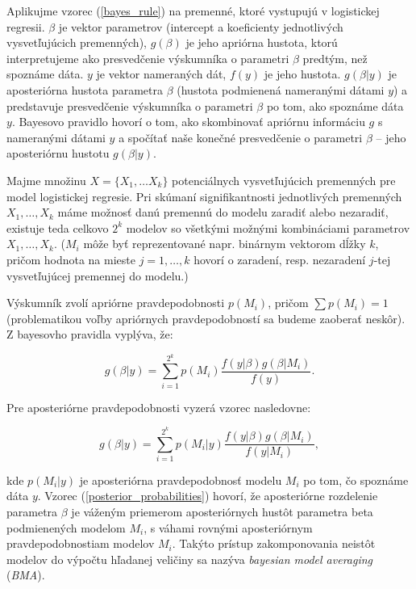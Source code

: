 Aplikujme vzorec (\ref{bayes_rule}) na premenné, ktoré vystupujú v logistickej regresii.
\( \beta \) je vektor parametrov (intercept a koeficienty jednotlivých vysvetľujúcich premenných),
\( g(\beta) \) je jeho apriórna hustota, ktorú interpretujeme ako presvedčenie výskumníka o parametri \( \beta \) predtým, než spoznáme dáta.
\( y \) je vektor nameraných dát, \( f(y) \) je jeho hustota.
\( g(\beta | y) \) je aposteriórna hustota parametra \( \beta \) (hustota podmienená nameranými dátami \( y \)) a predstavuje presvedčenie výskumníka o parametri \( \beta \) po tom, ako spoznáme dáta \( y \).
Bayesovo pravidlo hovorí o tom, ako skombinovať apriórnu informáciu \( g \) s nameranými dátami \( y \) a spočítať naše konečné presvedčenie o parametri \( \beta \) – jeho aposteriórnu hustotu \( g(\beta|y) \).

Majme množinu \( X = \{X_1, \ldots X_k\} \) potenciálnych vysvetľujúcich premenných pre model logistickej regresie.
Pri skúmaní signifikantnosti jednotlivých premenných \( X_1, \ldots, X_k \) máme možnosť danú premennú do modelu zaradiť alebo nezaradiť,
existuje teda celkovo \( 2^k \) modelov so všetkými možnými kombináciami parametrov \( X_1, \ldots, X_k \).
(\( M_i \) môže byť reprezentované napr. binárnym vektorom dĺžky \(k\), pričom hodnota na mieste \( j = 1, \ldots, k \) hovorí o zaradení, resp. nezaradení \(j\)-tej vysvetľujúcej premennej do modelu.)

Výskumník zvolí apriórne pravdepodobnosti \( p(M_i) \), pričom \( \sum p(M_i) = 1 \) (problematikou voľby apriórnych pravdepodobností sa budeme zaoberať neskôr).
Z bayesovho pravidla vyplýva, že:

\[
    g(\beta | y) = \sum_{i = 1}^{2^k} p(M_i) \frac{f(y | \beta) g(\beta | M_i)}{f(y)}.
\]

Pre aposteriórne pravdepodobnosti vyzerá vzorec nasledovne:

\begin{equation} \label{posterior_probabilities}
    g(\beta | y) = \sum_{i = 1}^{2^k} p(M_i | y) \frac{f(y | \beta) g(\beta | M_i)}{f(y | M_i)},
\end{equation}

kde \(p(M_i|y)\) je aposteriórna pravdepodobnosť modelu \(M_i\) po tom, čo spoznáme dáta \(y\).
Vzorec (\ref{posterior_probabilities}) hovorí, že aposteriórne rozdelenie parametra \(\beta\) je váženým priemerom aposteriórnych hustôt parametra beta podmienených modelom \(M_i\),
s váhami rovnými aposteriórnym pravdepodobnostiam modelov \(M_i\).
Takýto prístup zakomponovania neistôt modelov do výpočtu hľadanej veličiny sa nazýva \emph{bayesian model averaging} (\emph{BMA}).

